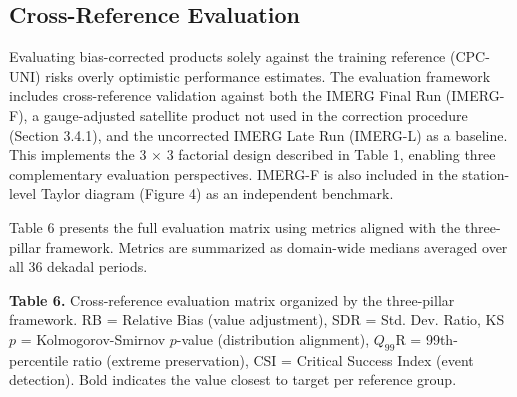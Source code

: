 \documentclass[remotesensing,article,submit,pdftex,moreauthors]{Definitions/mdpi}
\begin{document}
\subsection{Cross-Reference
Evaluation}\label{cross-reference-evaluation}

Evaluating bias-corrected products solely against the training reference
(CPC-UNI) risks overly optimistic performance estimates. The evaluation
framework includes cross-reference validation against both the IMERG
Final Run (IMERG-F), a gauge-adjusted satellite product not used in the
correction procedure (Section 3.4.1), and the uncorrected IMERG Late Run
(IMERG-L) as a baseline. This implements the 3 \(\times\) 3 factorial
design described in Table 1, enabling three complementary evaluation
perspectives. IMERG-F is also included in the station-level Taylor
diagram (Figure 4) as an independent benchmark.

Table 6 presents the full evaluation matrix using metrics aligned with
the three-pillar framework. Metrics are summarized as domain-wide
medians averaged over all 36 dekadal periods.

\textbf{Table 6.} Cross-reference evaluation matrix organized by the
three-pillar framework. RB = Relative Bias (value adjustment), SDR =
Std. Dev. Ratio, KS \(p\) = Kolmogorov-Smirnov \(p\)-value (distribution
alignment), \(Q_{99}\)R = 99th-percentile ratio (extreme preservation),
CSI = Critical Success Index (event detection). Bold indicates the value
closest to target per reference group.
\end{document}

